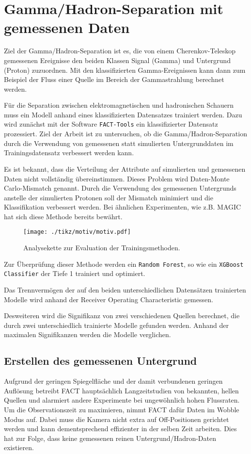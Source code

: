 \chapter{Gamma/Hadron-Separation mit gemessenen Daten}
Ziel der Gamma/Hadron-Separation ist es, die von einem Cherenkov-Teleskop gemessenen Ereignisse den beiden Klassen Signal (Gamma) und Untergrund (Proton) zuzuordnen.
Mit den klassifizierten Gamma-Ereignissen kann dann zum Beispiel der Fluss einer Quelle im Bereich der Gammastrahlung berechnet werden.

Für die Separation zwischen elektromagnetischen und hadronischen Schauern muss ein Modell anhand eines klassifizierten Datensatzes trainiert werden.
Dazu wird zunächst mit der Software \texttt{FACT-Tools} \cite{Bockermann} ein klassifizierter Datensatz prozessiert.
Ziel der Arbeit ist zu untersuchen, ob die Gamma/Hadron-Separation durch die Verwendung von gemessenen statt simulierten Untergrunddaten im Trainingsdatensatz verbessert werden kann.

Es ist bekannt, dass die Verteilung der Attribute auf simulierten und gemessenen Daten nicht vollständig übereinstimmen.
Dieses Problem wird Daten-Monte Carlo-Mismatch genannt.
Durch die Verwendung des gemessenen Untergrunds anstelle der simulierten Protonen soll der Mismatch minimiert und die Klassifikation verbessert werden.
Bei ähnlichen Experimenten, wie z.B. MAGIC \cite{magic} hat sich diese Methode bereits bewährt. 
\begin{figure}[H]
  \centering
  \texttt{[image: ./tikz/motiv/motiv.pdf]}
  \caption{Analysekette zur Evaluation der Trainingsmethoden.}
\end{figure}
Zur Überprüfung dieser Methode werden ein \texttt{Random Forest}, so wie ein \texttt{XGBoost Classifier} der Tiefe 1 trainiert und optimiert.

Das Trennvermögen der auf den beiden unterschiedlichen Datensätzen trainierten Modelle wird anhand der Receiver Operating Characteristic gemessen.

Desweiteren wird die Signifikanz von zwei verschiedenen Quellen berechnet, die durch zwei unterschiedlich trainierte Modelle gefunden werden. 
Anhand der maximalen Signifikanzen werden die Modelle verglichen.
\section{Erstellen des gemessenen Untergrund}
\label{sec:makeUnter}
Aufgrund der geringen Spiegelfläche und der damit verbundenen geringen Auflösung betreibt FACT hauptsächlich Langzeitstudien von bekannten, hellen Quellen und alarmiert andere Experimente bei ungewöhnlich hohen Flussraten.
Um die Observationszeit zu maximieren, nimmt FACT dafür Daten im Wobble Modus auf. 
Dabei muss die Kamera nicht extra auf Off-Positionen gerichtet werden und kann dementsprechend effizienter in der selben Zeit arbeiten. 
Dies hat zur Folge, dass keine gemessenen reinen Untergrund/Hadron-Daten existieren. 

